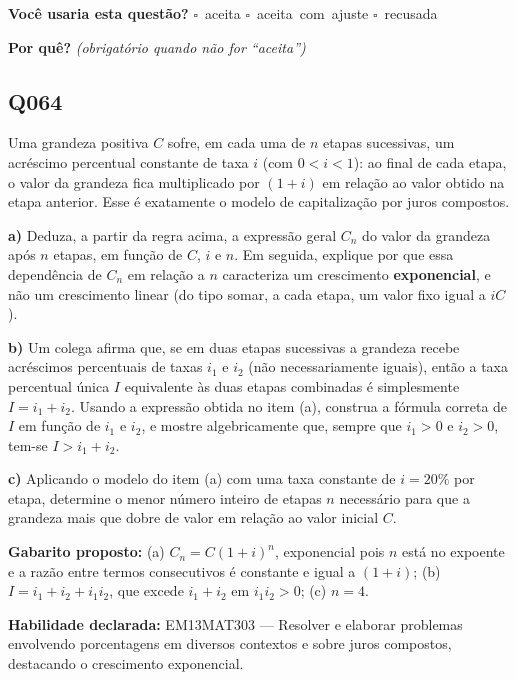\documentclass[11pt,a4paper]{article}
\begin{document}
\textbf{Você usaria esta questão?}\quad
\mbox{$\square$~aceita} \quad \mbox{$\square$~aceita com ajuste} \quad
\mbox{$\square$~recusada}

\textbf{Por quê?} \emph{(obrigatório quando não for ``aceita'')}

\underline{\hspace{\linewidth}}

\underline{\hspace{\linewidth}}
\vspace{0.6em}

\begin{samepage}
\subsection*{Q064}
Uma grandeza positiva $C$ sofre, em cada uma de $n$ etapas sucessivas, um acréscimo percentual constante de taxa $i$ (com $0<i<1$): ao final de cada etapa, o valor da grandeza fica multiplicado por $(1+i)$ em relação ao valor obtido na etapa anterior. Esse é exatamente o modelo de capitalização por juros compostos.

\textbf{a)} Deduza, a partir da regra acima, a expressão geral $C_n$ do valor da grandeza após $n$ etapas, em função de $C$, $i$ e $n$. Em seguida, explique por que essa dependência de $C_n$ em relação a $n$ caracteriza um crescimento \textbf{exponencial}, e não um crescimento linear (do tipo somar, a cada etapa, um valor fixo igual a $iC$).

\textbf{b)} Um colega afirma que, se em duas etapas sucessivas a grandeza recebe acréscimos percentuais de taxas $i_1$ e $i_2$ (não necessariamente iguais), então a taxa percentual única $I$ equivalente às duas etapas combinadas é simplesmente $I = i_1+i_2$. Usando a expressão obtida no item (a), construa a fórmula correta de $I$ em função de $i_1$ e $i_2$, e mostre algebricamente que, sempre que $i_1>0$ e $i_2>0$, tem-se $I > i_1+i_2$.

\textbf{c)} Aplicando o modelo do item (a) com uma taxa constante de $i=20\%$ por etapa, determine o menor número inteiro de etapas $n$ necessário para que a grandeza mais que dobre de valor em relação ao valor inicial $C$.

\textbf{Gabarito proposto:} (a) $C_n = C(1+i)^n$, exponencial pois $n$ está no expoente e a razão entre termos consecutivos é constante e igual a $(1+i)$; (b) $I = i_1+i_2+i_1i_2$, que excede $i_1+i_2$ em $i_1i_2>0$; (c) $n=4$.

\textbf{Habilidade declarada:} EM13MAT303 --- Resolver e elaborar problemas envolvendo porcentagens em diversos contextos e sobre juros compostos, destacando o crescimento exponencial.
\end{samepage}
\end{document}
